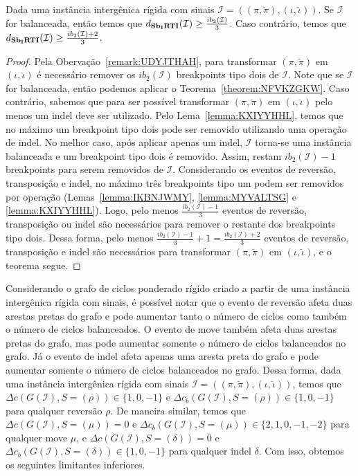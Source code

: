 \begin{theorem}\label{theorem:JGVDYLDM}
Dada uma instância intergênica rígida com sinais $\mathcal{I}=((\pi,\breve\pi),(\iota,\breve\iota))$. Se $\mathcal{I}$ for balanceada, então temos que $d_{\textbf{Sb\textsubscript{I}RTI}}(\mathcal{I}) \ge \frac{ib_2(\mathcal{I})}{3}$. Caso contrário, temos que $d_{\textbf{Sb\textsubscript{I}RTI}}(\mathcal{I}) \ge \frac{ib_2(\mathcal{I}) + 2}{3}$.
\end{theorem}
\begin{proof}
Pela Obervação~\ref{remark:UDYJTHAH}, para transformar $(\pi,\breve\pi)$ em $(\iota,\breve\iota)$ é necessário remover os $ib_2(\mathcal{I})$ breakpoints tipo dois de $\mathcal{I}$. Note que se $\mathcal{I}$ for balanceada, então podemos aplicar o Teorema~\ref{theorem:NFVKZGKW}. Caso contrário, sabemos que para ser possível transformar $(\pi,\breve\pi)$ em $(\iota,\breve\iota)$ pelo menos um indel deve ser utilizado. Pelo Lema~\ref{lemma:KXIYYHHL}, temos que no máximo um breakpoint tipo dois pode ser removido utilizando uma operação de indel. No melhor caso, após aplicar apenas um indel, $\mathcal{I}$  torna-se uma instância balanceada e um breakpoint tipo dois é removido. Assim, restam $ib_2(\mathcal{I}) - 1$ breakpoints para serem removidos de $\mathcal{I}$. Considerando os eventos de reversão, transposição e indel, no máximo três breakpoints tipo um podem ser removidos por operação (Lemas~\ref{lemma:IKBNJWMY}, \ref{lemma:MYVALTSG} e \ref{lemma:KXIYYHHL}). Logo, pelo menos $\frac{ib_2(\mathcal{I}) - 1}{3}$ eventos de reversão, transposição ou indel são necessários para remover o restante dos breakpoints tipo dois. Dessa forma, pelo menos $\frac{ib_2(\mathcal{I}) - 1}{3} + 1 = \frac{ib_2(\mathcal{I}) + 2}{3}$ eventos de reversão, transposição e indel são necessários para transformar $(\pi,\breve\pi)$ em $(\iota,\breve\iota)$, e o teorema segue.
\end{proof}

Considerando o grafo de ciclos ponderado rígido criado a partir de uma instância intergênica rígida com sinais, é possível notar que o evento de reversão afeta duas arestas pretas do grafo e pode aumentar tanto o número de ciclos como também o número de ciclos balanceados. O evento de move também afeta duas arestas pretas do grafo, mas pode aumentar somente o número de ciclos balanceados no grafo. Já o evento de indel afeta apenas uma aresta preta do grafo e pode aumentar somente o número de ciclos balanceados no grafo. Dessa forma, dada uma instância intergênica rígida com sinais $\mathcal{I} = ((\pi,\breve\pi),(\iota,\breve\iota))$, temos que $\Delta c(G(\mathcal{I}), S=(\rho)) \in \{1,0,-1\}$ e $\Delta c_b(G(\mathcal{I}), S=(\rho)) \in \{1,0,-1\}$ para qualquer reversão $\rho$. De maneira similar, temos que $\Delta c(G(\mathcal{I}), S=(\mu)) = 0$ e $\Delta c_b(G(\mathcal{I}), S=(\mu)) \in \{2,1,0,{-1},{-2}\}$ para qualquer move $\mu$, e $\Delta c(G(\mathcal{I}), S=(\delta)) = 0$ e $\Delta c_b(G(\mathcal{I}), S=(\delta)) \in \{1,0,{-1}\}$ para qualquer indel $\delta$. Com isso, obtemos os seguintes limitantes inferiores.

